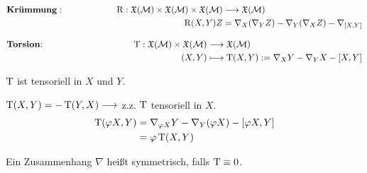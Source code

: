 \begin{align*}
\text{\textbf{Krümmung}}:  \qquad \qquad \qquad\operatorname{R}: \mathfrak{X}(\mathcal{M}) \times \mathfrak{X}(\mathcal{M}) \times \mathfrak{X}(\mathcal{M}) &\longrightarrow \mathfrak{X}(\mathcal{M}) \\
\operatorname{R}(X,Y)Z &= \nabla_X(\nabla_YZ) - \nabla_Y(\nabla_XZ) - \nabla_{[X,Y]}
\end{align*}


\begin{align*}
\text{\textbf{Torsion}:} \qquad\qquad\qquad\qquad\qquad \operatorname{T}: \mathfrak{X}(\mathcal{M}) \times \mathfrak{X}(\mathcal{M}) &\longrightarrow \mathfrak{X}(\mathcal{M}) \\
(X,Y) &\longmapsto \operatorname{T}(X,Y) := \nabla_XY -\nabla_YX - [X,Y]
\end{align*}

\begin{lem}
$\operatorname{T}$ ist tensoriell in $X$ und $Y$.
\begin{bew}
$\operatorname{T}(X,Y) = -\operatorname{T}(Y,X)  \longrightarrow$ z.z. $\operatorname{T}$ tensoriell in $X$. 
\begin{align*}
\operatorname{T}(\varphi X,Y) &= \nabla_{\varphi X}Y -  \nabla_Y(\varphi X) - [\varphi X,Y] \\
						&= \varphi\operatorname{T}(X,Y)
\end{align*}
\end{bew}
\end{lem}

\begin{defs}
Ein Zusammenhang $\nabla$ heißt symmetrisch, falls $\operatorname{T} \equiv 0$.
\end{defs}

